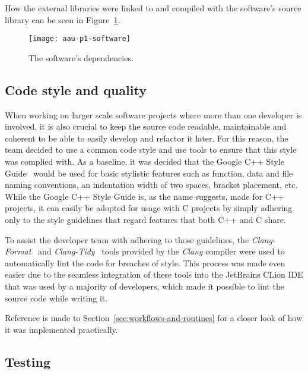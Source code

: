 How the external libraries were linked to and compiled with the software's source library can be seen in
Figure~\ref{fig:figure10}.

\begin{figure}
    \centering
    \caption{The software's dependencies.}
    \texttt{[image: aau-p1-software]}
    \label{fig:figure10}
\end{figure}

\subsection{Code style and quality}\label{subsec:code-style-and-quality}

When working on larger scale software projects where more than one developer is involved, it is also crucial to keep the
source code readable, maintainable and coherent to be able to easily develop and refactor it later.
For this reason, the team decided to use a common code style and use tools to ensure that this style was complied with.
As a baseline, it was decided that the Google C++ Style Guide~\cite{google-style} would be used for basic stylistic
features such as function, data and file naming conventions, an indentation width of two spaces, bracket placement, etc.
While the Google C++ Style Guide is, as the name suggests, made for C++ projects, it can easily be adopted for usage
with C projects by simply adhering only to the style guidelines that regard features that both C++ and C share.

To assist the developer team with adhering to those guidelines, the \textit{Clang-Format}~\cite{clang-format} and
\textit{Clang-Tidy}~\cite{clang-tidy} tools provided by the \textit{Clang} compiler were used to automatically lint
the code for breaches of style.
This process was made even easier due to the seamless integration of these tools into the JetBrains CLion IDE that was
used by a majority of developers, which made it possible to lint the source code while writing it.


Reference is made to Section~\ref{sec:workflows-and-routines} for a closer look of how it was implemented practically.

\subsection{Testing}\label{subsec:testing}


